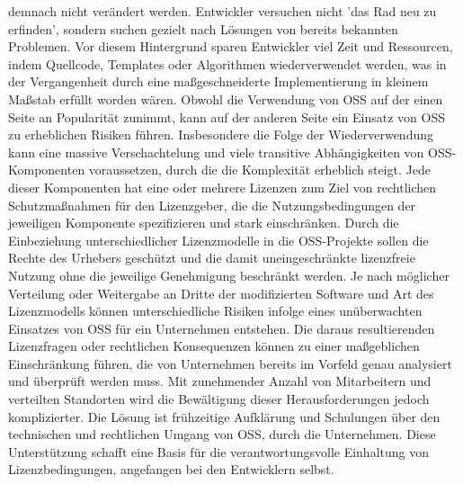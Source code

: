 demnach nicht verändert werden. \cite{henkel_code_2010} Entwickler versuchen nicht 'das Rad neu zu erfinden', sondern suchen gezielt nach Lösungen von bereits bekannten Problemen. Vor diesem Hintergrund sparen Entwickler viel Zeit und Ressourcen, indem Quellcode, Templates oder Algorithmen wiederverwendet werden, was in der Vergangenheit durch eine maßgeschneiderte Implementierung in kleinem Maßstab erfüllt worden wären. \cite{spinellis_how_2004} Obwohl die Verwendung von OSS auf der einen Seite an Popularität zunimmt, kann auf der anderen Seite ein Einsatz von OSS zu erheblichen Risiken führen. Insbesondere die Folge der Wiederverwendung kann eine massive Verschachtelung und viele transitive Abhängigkeiten von OSS-Komponenten voraussetzen, durch die die Komplexität erheblich steigt. \cite{thelen_beschleunigung_2021} Jede dieser Komponenten hat eine oder mehrere Lizenzen zum Ziel von rechtlichen Schutzmaßnahmen für den Lizenzgeber, die die Nutzungsbedingungen der jeweiligen Komponente spezifizieren und stark einschränken. Durch die Einbeziehung unterschiedlicher Lizenzmodelle in die OSS-Projekte sollen die Rechte des Urhebers geschützt und die damit uneingeschränkte lizenzfreie Nutzung ohne die jeweilige Genehmigung beschränkt werden. \cite{widmer_open-source-lizenzen_2006} Je nach möglicher Verteilung oder Weitergabe an Dritte der modifizierten Software und Art des Lizenzmodells können unterschiedliche Risiken infolge eines unüberwachten Einsatzes von OSS für ein Unternehmen entstehen. Die daraus resultierenden Lizenzfragen oder rechtlichen Konsequenzen können zu einer maßgeblichen Einschränkung führen, die von Unternehmen bereits im Vorfeld genau analysiert und überprüft werden muss. Mit zunehmender Anzahl von Mitarbeitern und verteilten Standorten wird die Bewältigung dieser Herausforderungen jedoch komplizierter. Die Lösung ist frühzeitige Aufklärung und Schulungen über den technischen und rechtlichen Umgang von OSS, durch die Unternehmen. Diese Unterstützung schafft eine Basis für die verantwortungsvolle Einhaltung von Lizenzbedingungen, angefangen bei den Entwicklern selbst. 

